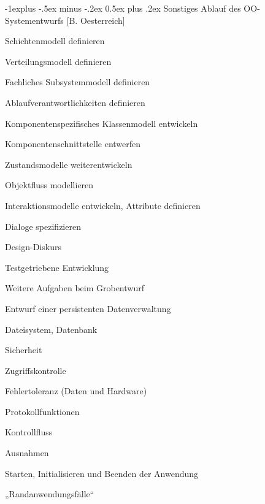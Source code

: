 \documentclass[a4paper]{article}
\makeatletter
\renewcommand{\subsection}{\@startsection{subsection}{2}{0mm}%
                                {-1explus -.5ex minus -.2ex}%
                                {0.5ex plus .2ex}%
                                {\normalfont\normalsize\bfseries}}
\makeatother
\begin{document}
\begin{multicols}{3}
  \subsection{Sonstiges}
  Ablauf des OO-Systementwurfs [B. Oesterreich]
  \begin{itemize*}
    \item Schichtenmodell definieren
    \item Verteilungsmodell definieren
    \item Fachliches Subsystemmodell definieren
    \item Ablaufverantwortlichkeiten definieren
    \item Komponentenspezifisches Klassenmodell entwickeln
    \item Komponentenschnittstelle entwerfen
    \item Zustandsmodelle weiterentwickeln
    \item Objektfluss modellieren
    \item Interaktionsmodelle entwickeln, Attribute definieren
    \item Dialoge spezifizieren
    \item Design-Diskurs
    \item Testgetriebene Entwicklung
  \end{itemize*}

  Weitere Aufgaben beim Grobentwurf
  \begin{itemize*}
    \item Entwurf einer persistenten Datenverwaltung
          \begin{itemize*}
            \item Dateisystem, Datenbank
          \end{itemize*}
    \item Sicherheit
          \begin{itemize*}
            \item Zugriffskontrolle
            \item Fehlertoleranz (Daten und Hardware)
            \item Protokollfunktionen
          \end{itemize*}
    \item Kontrollfluss
          \begin{itemize*}
            \item Ausnahmen
            \item Starten, Initialisieren und Beenden der Anwendung
            \item „Randanwendungsfälle“
          \end{itemize*}
  \end{itemize*}


\end{multicols}
\end{document}
